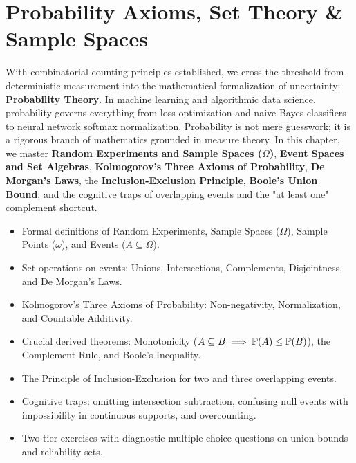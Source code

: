 \chapter{Probability Axioms, Set Theory \& Sample Spaces}

With combinatorial counting principles established, we cross the threshold from deterministic measurement into the mathematical formalization of uncertainty: \textbf{Probability Theory}. In machine learning and algorithmic data science, probability governs everything from loss optimization and naive Bayes classifiers to neural network softmax normalization. Probability is not mere guesswork; it is a rigorous branch of mathematics grounded in measure theory. In this chapter, we master \textbf{Random Experiments and Sample Spaces ($\Omega$)}, \textbf{Event Spaces and Set Algebras}, \textbf{Kolmogorov's Three Axioms of Probability}, \textbf{De Morgan's Laws}, the \textbf{Inclusion-Exclusion Principle}, \textbf{Boole's Union Bound}, and the cognitive traps of overlapping events and the "at least one" complement shortcut.

\vspace{0.5cm}
\begin{tcolorbox}[colback=primarylight, colframe=primarydark, title={\textbf{What You'll Learn in this Chapter}}]
\begin{itemize}
    \item Formal definitions of Random Experiments, Sample Spaces ($\Omega$), Sample Points ($\omega$), and Events ($A \subseteq \Omega$).
    \item Set operations on events: Unions, Intersections, Complements, Disjointness, and De Morgan's Laws.
    \item Kolmogorov's Three Axioms of Probability: Non-negativity, Normalization, and Countable Additivity.
    \item Crucial derived theorems: Monotonicity ($A \subseteq B \implies \P(A) \le \P(B)$), the Complement Rule, and Boole's Inequality.
    \item The Principle of Inclusion-Exclusion for two and three overlapping events.
    \item Cognitive traps: omitting intersection subtraction, confusing null events with impossibility in continuous supports, and overcounting.
    \item Two-tier exercises with diagnostic multiple choice questions on union bounds and reliability sets.
\end{itemize}
\end{tcolorbox}

